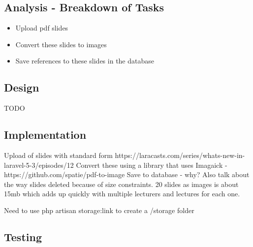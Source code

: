 \documentclass{article}
\begin{document}
\subsection{Analysis - Breakdown of Tasks}
\begin{itemize}
	\item Upload pdf slides
	\item Convert these slides to images
	\item Save references to these slides in the database
\end{itemize}
\subsection{Design}
TODO
\subsection{Implementation}
Upload of slides with standard form https://laracasts.com/series/whats-new-in-laravel-5-3/episodes/12
Convert these using a library that uses Imagaick - https://github.com/spatie/pdf-to-image
Save to database - why? Also talk about the way slides deleted because of size constraints. 20 slides as images is about 15mb which adds up quickly with multiple lecturers and lectures for each one.

Need to use php artisan storage:link to create a /storage folder
\subsection{Testing}
\newpage

%
%
\end{document}

